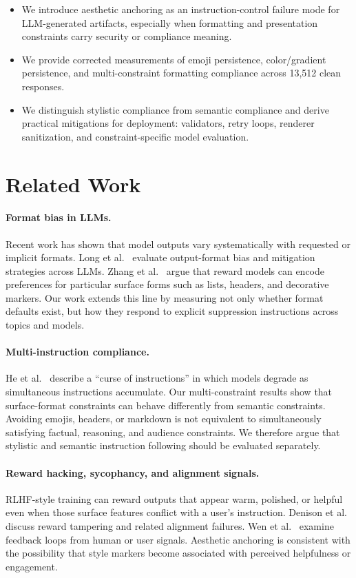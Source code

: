 \documentclass[runningheads,a4paper]{llncs}
\begin{document}
\begin{itemize}
    \item We introduce aesthetic anchoring as an instruction-control failure mode for LLM-generated artifacts, especially when formatting and presentation constraints carry security or compliance meaning.
    \item We provide corrected measurements of emoji persistence, color/gradient persistence, and multi-constraint formatting compliance across 13,512 clean responses.
    \item We distinguish stylistic compliance from semantic compliance and derive practical mitigations for deployment: validators, retry loops, renderer sanitization, and constraint-specific model evaluation.
\end{itemize}

\section{Related Work}

\paragraph{Format bias in LLMs.}
Recent work has shown that model outputs vary systematically with requested or implicit formats. Long et al.~\cite{long2024format} evaluate output-format bias and mitigation strategies across LLMs. Zhang et al.~\cite{zhang2025format} argue that reward models can encode preferences for particular surface forms such as lists, headers, and decorative markers. Our work extends this line by measuring not only whether format defaults exist, but how they respond to explicit suppression instructions across topics and models.

\paragraph{Multi-instruction compliance.}
He et al.~\cite{he2025curse} describe a ``curse of instructions'' in which models degrade as simultaneous instructions accumulate. Our multi-constraint results show that surface-format constraints can behave differently from semantic constraints. Avoiding emojis, headers, or markdown is not equivalent to simultaneously satisfying factual, reasoning, and audience constraints. We therefore argue that stylistic and semantic instruction following should be evaluated separately.

\paragraph{Reward hacking, sycophancy, and alignment signals.}
RLHF-style training can reward outputs that appear warm, polished, or helpful even when those surface features conflict with a user's instruction. Denison et al.~\cite{denison2024sycophancy} discuss reward tampering and related alignment failures. Wen et al.~\cite{wen2024rluf} examine feedback loops from human or user signals. Aesthetic anchoring is consistent with the possibility that style markers become associated with perceived helpfulness or engagement.
\end{document}
